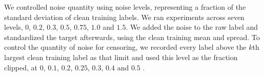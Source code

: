 
We controlled noise quantity using noise levels, representing a fraction of the standard deviation of clean training labels. We ran experiments across seven levels, $0$, $0.2$, $0.3$, $0.5$, $0.75$, $1.0$ and $1.5$. We added the noise to the raw label and standardized the target afterwards, using the clean training mean and spread. To control the quantity of noise for censoring, we recorded every label above the $k$th largest clean training label as that limit and used this level as the fraction clipped, at $0$, $0.1$, $0.2$, $0.25$, $0.3$, $0.4$ and $0.5$ \citep{Svensson2025}.

